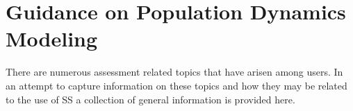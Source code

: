 
\section{Guidance on Population Dynamics Modeling}

There are numerous assessment related topics that have arisen among users.  In an attempt to capture information on these  topics and how they may be related to the use of SS a collection of general information is provided here.





\pagebreak

